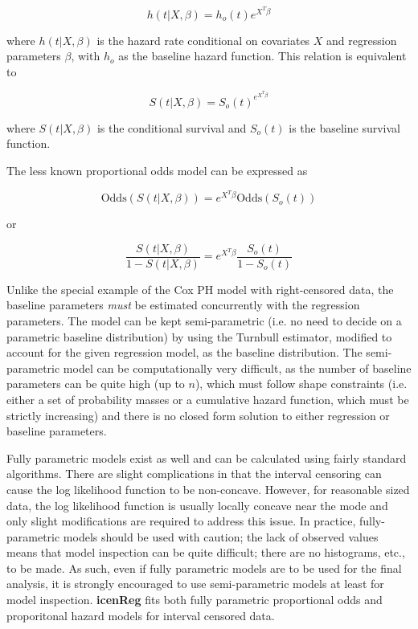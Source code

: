 \documentclass[11pt]{report}
\begin{document}
  \[ h(t | X, \beta) = h_o(t) e^{X^T \beta} \]
  
  where $h(t | X, \beta)$ is the hazard rate conditional on covariates $X$ and regression parameters $\beta$,
  with $h_o$ as the baseline hazard function. This relation is equivalent to 

  \[S(t | X, \beta) = S_o(t)^{e^{X^T \beta} } \]
  
  where $S(t| X, \beta)$ is the conditional survival and $S_o(t)$ is the baseline survival function. 
  
  The less known proportional odds model can be expressed as
  
  \[\text{Odds}(S(t | X, \beta)) = e^{X^T \beta} \text{Odds}(S_o(t)) \]
  \begin{center}  
  or
  \end{center}
  \[ \frac{S(t | X, \beta)} {1 - S(t | X, \beta) } = e^{X^T \beta}\frac{S_o(t)} {1 - S_o(t)} \]
  
  
  Unlike the special example
  of the Cox PH model with right-censored data, the baseline parameters 
  \emph{must} be estimated concurrently
  with the regression parameters. The model can be kept semi-parametric (i.e. no need to 
  decide on a parametric baseline distribution) by using the Turnbull estimator, modified
  to account for the given regression model, as the baseline distribution. 
  The semi-parametric model can be computationally very difficult,
  as the number of baseline parameters can be quite high (up to $n$), which must follow
  shape constraints (i.e. either a set of probability masses or a cumulative hazard function,
  which must be strictly increasing) and there is no closed form solution to either
  regression or baseline parameters.
  
  Fully parametric models exist as well and can be calculated using fairly standard
  algorithms. There are slight complications in that the interval censoring can cause the log
  likelihood function to be non-concave. However, for reasonable sized data, the log likelihood 
  function is usually locally concave near the mode and only slight modifications are required to 
  address this issue. In practice, fully-parametric models should be used with caution; the
  lack of observed values means that model inspection can be quite difficult; there are no
  histograms, etc., to be made. As such, even if fully parametric models are to be used for
  the final analysis, it is strongly encouraged to use semi-parametric models at least for
  model inspection. {\bf icenReg} fits both fully parametric proportional odds and 
  proporitonal hazard models for interval censored data. 
  
\end{document}
